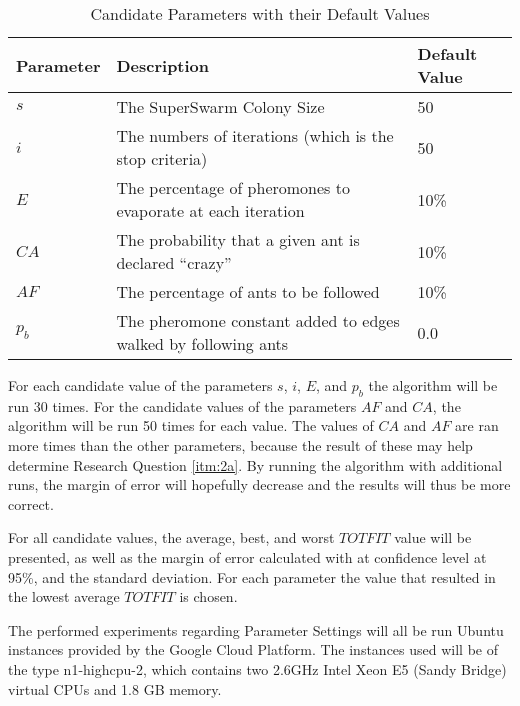 \begin{table}[H]
	\begin{tabular}{|l|l|l|}
    	\hline
    	Parameter & Description & Default Value\\
    	\hline
    	$s$ & The SuperSwarm Colony Size & 50\\
    	$i$ & The numbers of iterations (which is the stop criteria) & 50\\
    	$E$ & The percentage of pheromones to evaporate at each iteration & 10\%\\
    	$CA$ & The probability that a given ant is declared ``crazy'' & 10\%\\
    	$AF$ & The percentage of ants to be followed & 10\%\\
        $p_b$ & The pheromone constant added to edges walked by following ants & 0.0\\
   	    \hline
    \end{tabular}
    \caption {Candidate Parameters with their Default Values}
    \label{table:parameters}
\end{table}

For each candidate value of the parameters $s$, $i$, $E$, and $p_b$ the algorithm will be run 30 times.  For the candidate values of the parameters $AF$ and $CA$, the algorithm will be run 50 times for each value. 
The values of $CA$ and $AF$ are ran more times than the other parameters, because the result of these may help determine Research Question \vref{itm:2a}. By running the algorithm with additional runs, the margin of error will hopefully decrease and the results will thus be more correct.

For all candidate values, the average, best, and worst $TOTFIT$ value will be presented, as well as the margin of error calculated with at confidence level at 95\%, and the standard deviation. For each parameter the value that resulted in the lowest average $TOTFIT$ is chosen. 

The performed experiments regarding Parameter Settings will all be run Ubuntu instances provided by the Google Cloud Platform. The instances used will be of the type n1-highcpu-2, which contains two 2.6GHz Intel Xeon E5 (Sandy Bridge) virtual CPUs and 1.8 GB memory\cite{website:google}.  


